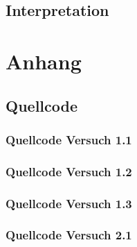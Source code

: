 \documentclass[12pt, oneside, a4paper, \docLanguage]{report}
\begin{document}
\newpage
\section{Interpretation}
\label{chap:VERSUCH_2_INTERPRETATION}

%
%
\renewcommand\thesection{A.\arabic{section}}
\renewcommand\thesubsection{\thesection.\arabic{subsection}}

\chapter*{Anhang}
\label{chap:APPENDIX}
\addtocounter{chapter}{1}
\setcounter{section}{0}

\section{Quellcode}
\label{chap:APPENDIX_SOURCECODE}

\subsection{Quellcode Versuch 1.1}
\label{chap:APPENDIX_SOURCECODE_V1.1}

\newpage
\subsection{Quellcode Versuch 1.2}
\label{chap:APPENDIX_SOURCECODE_V1.2}

\subsection{Quellcode Versuch 1.3}
\label{chap:APPENDIX_SOURCECODE_V1.3}

\newpage
\subsection{Quellcode Versuch 2.1}
\label{chap:APPENDIX_SOURCECODE_V2.1}

\newpage
\end{document}

